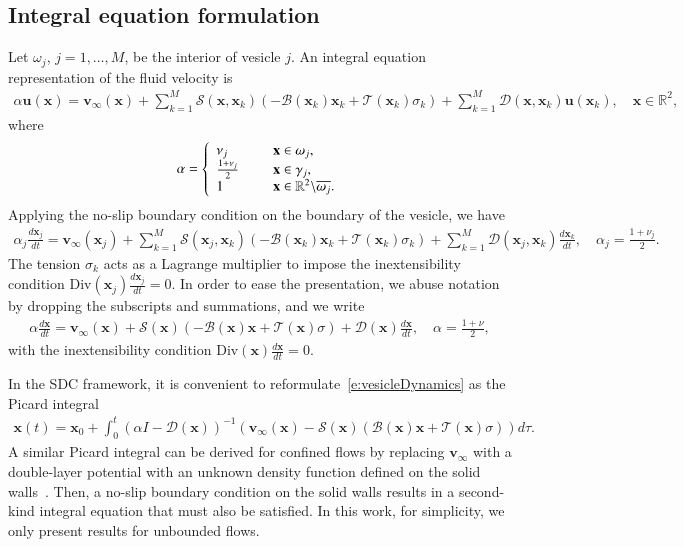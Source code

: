 \documentclass[3p,times,procedia]{elsarticle}
\newcommand{\uu}{{\mathbf{u}}}
\newcommand{\vv}{{\mathbf{v}}}
\newcommand{\xx}{{\mathbf{x}}}
\newcommand{\BB}{{\mathcal{B}}}
\newcommand{\DD}{{\mathcal{D}}}
\newcommand{\Div}{{\mathrm{Div}}}
\newcommand{\RR}{{\mathbb{R}}}
\renewcommand{\SS}{{\mathcal{S}}}
\newcommand{\TT}{{\mathcal{T}}}
\def\gap{\hspace*{.2in}}
\begin{document}
\subsection{Integral equation formulation}
Let $\omega_{j}$, $j=1,\dots,M$, be the interior of vesicle $j$.  An
integral equation representation of the fluid velocity is~\cite{poz1992}
\begin{align*}
  \alpha \uu(\xx) = \vv_{\infty}(\xx) + \sum_{k=1}^{M}\SS(\xx,\xx_{k})
  \left(-\BB(\xx_{k})\xx_{k} + \TT(\xx_{k})\sigma_{k}\right) + 
  \sum_{k=1}^{M}\DD(\xx,\xx_{k})\uu(\xx_{k}), \quad \xx \in \RR^{2},
\end{align*}
where
\begin{align*}
  \alpha = \left\{
  \begin{array}{ll}
    \nu_{j}             &\gap \xx \in \omega_{j}, \\
    \frac{1+\nu_{j}}{2} &\gap \xx \in \gamma_{j}, \\
    1                   &\gap \xx \in 
          \RR^{2} \backslash \overline{\omega_{j}}.
  \end{array}
  \right.
\end{align*}
Applying the no-slip boundary condition on the boundary of the vesicle,
we have
\begin{align*}
  \alpha_{j}\frac{d\xx_{j}}{dt} = \vv_{\infty}(\xx_{j}) + 
  \sum_{k=1}^{M}\SS(\xx_{j},\xx_{k})
  \left(-\BB(\xx_{k})\xx_{k} + \TT(\xx_{k})\sigma_{k}\right) + 
  \sum_{k=1}^{M}\DD(\xx_{j},\xx_{k})\frac{d\xx_{k}}{dt}, \quad 
  \alpha_{j} = \frac{1+\nu_{j}}{2}.
\end{align*}
The tension $\sigma_{k}$ acts as a Lagrange multiplier to impose the
inextensibility condition $\Div(\xx_{j}) \frac{d\xx_{j}}{dt} = 0$.  In
order to ease the presentation, we abuse notation by dropping the
subscripts and summations, and we write
\begin{align}
  \alpha \frac{d\xx}{dt} = \vv_{\infty}(\xx) + 
    \SS(\xx)\left(-\BB(\xx)\xx + \TT(\xx)\sigma\right) + \DD(\xx)\frac{d\xx}{dt},
  \quad \alpha = \frac{1+\nu}{2},
  \label{e:vesicleDynamics}
\end{align}
with the inextensibility condition $\Div(\xx)\frac{d\xx}{dt} = 0$.

In the SDC framework, it is convenient to
reformulate~\eqref{e:vesicleDynamics} as the Picard integral 
\begin{align}
  \xx(t) = \xx_{0} + \int_{0}^{t} (\alpha I - \DD(\xx))^{-1}
    (\vv_{\infty}(\xx)-\SS(\xx)(\BB(\xx)\xx + \TT(\xx)\sigma)) d\tau.
  \label{e:picard}
\end{align}
A similar Picard integral can be derived for confined flows by replacing
$\vv_{\infty}$ with a double-layer potential with an unknown density
function defined on the solid walls~\cite{qua:bir2014c}.  Then, a
no-slip boundary condition on the solid walls results in a second-kind
integral equation that must also be satisfied.  In this work, for
simplicity, we only present results for unbounded flows.
\end{document}
